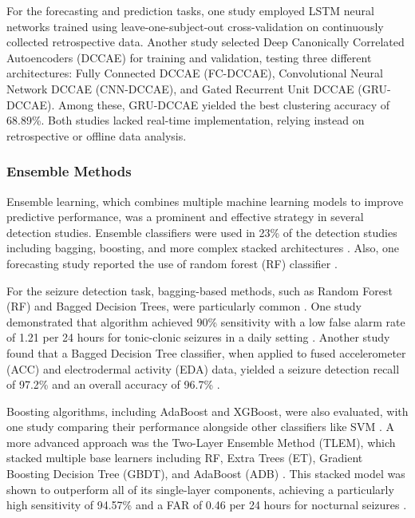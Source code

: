 For the forecasting and prediction tasks, one study \cite{Meisel2020-ii} employed LSTM neural networks trained using leave-one-subject-out cross-validation on continuously collected retrospective data. Another study \cite{Vieluf2023-ta} selected Deep Canonically Correlated Autoencoders (DCCAE) for training and validation, testing three different architectures: Fully Connected DCCAE (FC-DCCAE), Convolutional Neural Network DCCAE (CNN-DCCAE), and Gated Recurrent Unit DCCAE (GRU-DCCAE). Among these, GRU-DCCAE yielded the best clustering accuracy of 68.89\%. Both studies lacked real-time implementation, relying instead on retrospective or offline data analysis.



\subsubsection{Ensemble Methods}
Ensemble learning, which combines multiple machine learning models to improve predictive performance, was a prominent and effective strategy in several detection studies. Ensemble classifiers were used in 23\% of the detection studies  including bagging, boosting, and more complex stacked architectures \cite{Wang2022-lt, Chowdhury2022-bi, Vakilna2024-hk, Dong2022-oo, Jiang2022-zu, Wu2024-yl}. Also, one forecasting study reported the use of random forest (RF) classifier \cite{Vieluf2023-zv}.

For the seizure detection task, bagging-based methods, such as Random Forest (RF) and Bagged Decision Trees, were particularly common \cite{Chowdhury2022-bi, Wang2022-lt, Wu2024-yl, Vakilna2024-hk}. One study demonstrated that  algorithm achieved 90\% sensitivity with a low false alarm rate of 1.21 per 24 hours for tonic-clonic seizures in a daily setting \cite{Wang2022-lt}. Another study found that a Bagged Decision Tree classifier, when applied to fused accelerometer (ACC) and electrodermal activity (EDA) data, yielded a seizure detection recall of 97.2\% and an overall accuracy of 96.7\% \cite{Chowdhury2022-bi}.

Boosting algorithms, including AdaBoost and XGBoost, were also evaluated, with one study comparing their performance alongside other classifiers like SVM \cite{Xu2022-tx}. A more advanced approach was the Two-Layer Ensemble Method (TLEM), which stacked multiple base learners including RF, Extra Trees (ET), Gradient Boosting Decision Tree (GBDT), and AdaBoost (ADB) \cite{Dong2022-oo}. This stacked model was shown to outperform all of its single-layer components, achieving a particularly high sensitivity of 94.57\% and a FAR of 0.46 per 24 hours for nocturnal seizures \cite{Dong2022-oo}.

